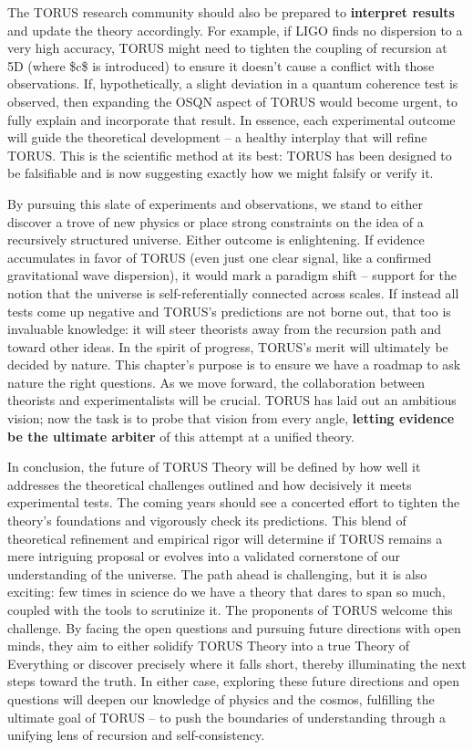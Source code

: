 The TORUS research community should also be prepared to
\textbf{interpret results} and update the theory accordingly. For
example, if LIGO finds no dispersion to a very high accuracy, TORUS
might need to tighten the coupling of recursion at 5D (where \$c\$ is
introduced) to ensure it doesn't cause a conflict with those
observations. If, hypothetically, a slight deviation in a quantum
coherence test is observed, then expanding the OSQN aspect of TORUS
would become urgent, to fully explain and incorporate that result. In
essence, each experimental outcome will guide the theoretical
development -- a healthy interplay that will refine TORUS. This is the
scientific method at its best: TORUS has been designed to be falsifiable
and is now suggesting exactly how we might falsify or verify it​.

By pursuing this slate of experiments and observations, we stand to
either discover a trove of new physics or place strong constraints on
the idea of a recursively structured universe. Either outcome is
enlightening. If evidence accumulates in favor of TORUS (even just one
clear signal, like a confirmed gravitational wave dispersion), it would
mark a paradigm shift -- support for the notion that the universe is
self-referentially connected across scales. If instead all tests come up
negative and TORUS's predictions are not borne out, that too is
invaluable knowledge: it will steer theorists away from the recursion
path and toward other ideas. In the spirit of progress, TORUS's merit
will ultimately be decided by nature. This chapter's purpose is to
ensure we have a roadmap to ask nature the right questions. As we move
forward, the collaboration between theorists and experimentalists will
be crucial. TORUS has laid out an ambitious vision; now the task is to
probe that vision from every angle, \textbf{letting evidence be the
ultimate arbiter} of this attempt at a unified theory.

In conclusion, the future of TORUS Theory will be defined by how well it
addresses the theoretical challenges outlined and how decisively it
meets experimental tests. The coming years should see a concerted effort
to tighten the theory's foundations and vigorously check its
predictions. This blend of theoretical refinement and empirical rigor
will determine if TORUS remains a mere intriguing proposal or evolves
into a validated cornerstone of our understanding of the universe. The
path ahead is challenging, but it is also exciting: few times in science
do we have a theory that dares to span so much, coupled with the tools
to scrutinize it. The proponents of TORUS welcome this challenge. By
facing the open questions and pursuing future directions with open
minds, they aim to either solidify TORUS Theory into a true Theory of
Everything or discover precisely where it falls short, thereby
illuminating the next steps toward the truth. In either case, exploring
these future directions and open questions will deepen our knowledge of
physics and the cosmos, fulfilling the ultimate goal of TORUS -- to push
the boundaries of understanding through a unifying lens of recursion and
self-consistency.

